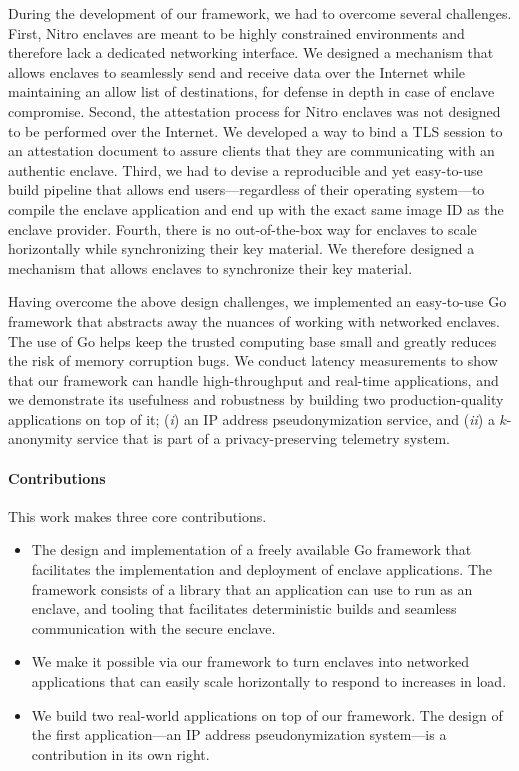 During the development of our framework, we had to overcome several challenges.
First, Nitro enclaves are meant to be highly constrained environments and
therefore lack a dedicated networking interface.  We designed a mechanism that
allows enclaves to seamlessly send and receive data over the Internet while
maintaining an allow list of destinations, for defense in depth in case of
enclave compromise.
%
Second, the attestation process for Nitro enclaves was not designed to be
performed over the Internet.  We developed a way to bind a TLS session to
an attestation document to assure clients that they are communicating with
an authentic enclave.
%
Third, we had to devise a reproducible and yet easy-to-use build pipeline that
allows end users---regardless of their operating system---to compile the enclave
application and end up with the exact same image ID as the enclave provider.
%
Fourth, there is no out-of-the-box way for enclaves to scale horizontally while
synchronizing their key material.  We therefore designed a mechanism that allows
enclaves to synchronize their key material.

Having overcome the above design challenges, we implemented an easy-to-use Go framework
that abstracts away the nuances of working with networked enclaves.  The use of
Go helps keep the trusted computing base small and greatly reduces the risk of
memory corruption bugs.  We conduct latency measurements to show that our
framework can handle high-throughput and real-time applications, and we
demonstrate its usefulness and robustness by building two production-quality
applications on top of it; (\emph{i}) an IP address pseudonymization service,
and (\emph{ii}) a $k$-anonymity service that is part of a privacy-preserving
telemetry system.

\paragraph{Contributions}

This work makes three core contributions.

\begin{itemize}
  \item The design and implementation of a freely available Go framework that
    facilitates the implementation and deployment of enclave applications.  The
    framework consists of a library that an application can use to run as an
    enclave, and tooling that facilitates deterministic builds and seamless
    communication with the secure enclave.

  \item We make it possible via our framework to turn enclaves into networked
    applications that can easily scale horizontally to respond to increases in
    load.

  \item We build two real-world applications on top of our framework.  The
    design of the first application---an IP address pseudonymization system---is
    a contribution in its own right.
\end{itemize}

